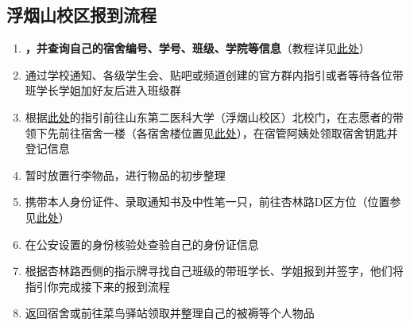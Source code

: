 \subsection[浮烟山校区报到流程]{浮烟山校区报到流程}
\begin{enumerate}
    \item \textbf{，并查询自己的宿舍编号、学号、班级、学院等信息}\footnotemark（教程详见\hyperref[freshman_query]{此处}）
    \item 通过学校通知、各级学生会、贴吧或频道创建的官方群内指引或者等待各位带班学长学姐加好友后进入班级群\footnotemark
    \item 根据\hyperref[goto_school]{此处}的指引前往山东第二医科大学（浮烟山校区）北校门，在志愿者\footnotemark 的带领下先前往宿舍一楼（各宿舍楼位置见\hyperref[map_fuyanshan_holistic]{此处}），在宿管阿姨处领取宿舍钥匙并登记信息
    \item 暂时放置行李物品，进行物品的初步整理
    \item 携带本人身份证件、录取通知书\footnotemark 及中性笔一只，前往杏林路D区方位（位置参见\hyperref[map_fuyanshan_holistic]{此处}）
    \item 在公安设置的身份核验处查验自己的身份证\footnotemark 信息
    \item 根据杏林路西侧的指示牌寻找自己班级的带班学长、学姐报到并签字，他们将指引你完成接下来的报到流程\footnotemark
    \item 返回宿舍或前往菜鸟驿站领取并整理自己的被褥等个人物品
\end{enumerate}